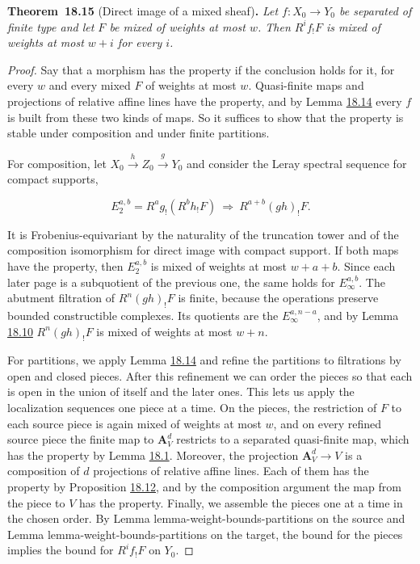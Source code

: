 \documentclass[11pt]{article}
\newenvironment{bpstatement}[2]{\par\addvspace{0.6\baselineskip}\noindent\textbf{#1}#2\textbf{.}\enspace\ignorespaces}
  {\par\addvspace{0.4\baselineskip}}
\newenvironment{bpstatementit}[2]{\begin{bpstatement}{#1}{#2}\itshape\ignorespaces}{\end{bpstatement}}
\begin{document}
\label{bp315}%
\begin{bpstatementit}{Theorem~18.15}{ (Direct image of a mixed sheaf)}
Let \(f:X_0\to Y_0\) be separated of finite type and let \(F\) be mixed of weights at most \(w\). Then \(R^if_!F\) is mixed of weights at most \(w+i\) for every \(i\).
\end{bpstatementit}

\begin{proof}[{Proof}]\label{bp316}%
Say that a morphism has the property if the conclusion holds for it, for every \(w\) and every mixed \(F\) of weights at most \(w\). Quasi-finite maps and projections of relative affine lines have the property, and by Lemma \hyperref[bp312]{18.14} every \(f\) is built from these two kinds of maps. So it suffices to show that the property is stable under composition and under finite partitions.

For composition, let \(X_0\xrightarrow{h}Z_0\xrightarrow{g}Y_0\) and consider the Leray spectral sequence for compact supports,

\[
E_2^{a,b}=R^ag_!(R^bh_!F)\ \Longrightarrow\ R^{a+b}(gh)_!F.
\]

It is Frobenius-equivariant by the naturality of the truncation tower and of the composition isomorphism for direct image with compact support. If both maps have the property, then \(E_2^{a,b}\) is mixed of weights at most \(w+a+b\). Since each later page is a subquotient of the previous one, the same holds for \(E_\infty^{a,b}\). The abutment filtration of \(R^n(gh)_!F\) is finite, because the operations preserve bounded constructible complexes. Its quotients are the \(E_\infty^{a,n-a}\), and by Lemma \hyperref[bp303]{18.10} \(R^n(gh)_!F\) is mixed of weights at most \(w+n\).

For partitions, we apply Lemma \hyperref[bp312]{18.14} and refine the partitions to filtrations by open and closed pieces. After this refinement we can order the pieces so that each is open in the union of itself and the later ones. This lets us apply the localization sequences one piece at a time. On the pieces, the restriction of \(F\) to each source piece is again mixed of weights at most \(w\), and on every refined source piece the finite map to \(\mathbf A^d_V\) restricts to a separated quasi-finite map, which has the property by Lemma \hyperref[bp275]{18.1}. Moreover, the projection \(\mathbf A^d_V\to V\) is a composition of \(d\) projections of relative affine lines. Each of them has the property by Proposition \hyperref[bp308]{18.12}, and by the composition argument the map from the piece to \(V\) has the property. Finally, we assemble the pieces one at a time in the chosen order. By Lemma lemma-weight-bounds-partitions on the source and Lemma lemma-weight-bounds-partitions on the target, the bound for the pieces implies the bound for \(R^if_!F\) on \(Y_0\).
\end{proof}
\end{document}
